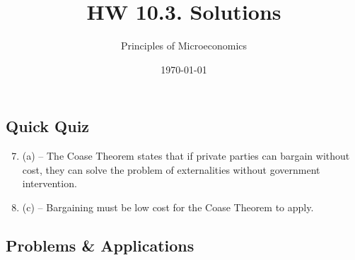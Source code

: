 \documentclass{article}
\title{HW 10.3. Solutions}
\author{Principles of Microeconomics}
\date{\today}
\begin{document}
\maketitle

\subsection*{Quick Quiz}

\begin{enumerate}
\setcounter{enumi}{6}

\item (a) -- The Coase Theorem states that if private parties can bargain without cost, they can solve the problem of externalities without government intervention.

\item (c) -- Bargaining must be low cost for the Coase Theorem to apply.

\end{enumerate}

\subsection*{Problems \& Applications}
\end{document}
